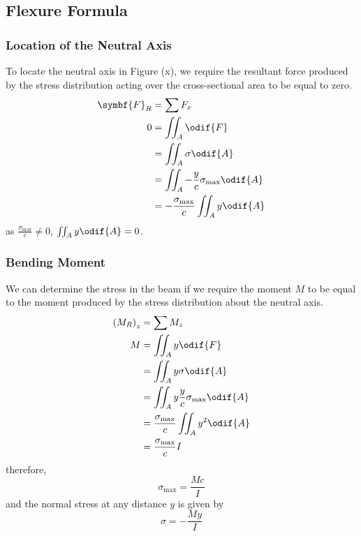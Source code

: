 \documentclass{article}
\begin{document}
\subsection{Flexure Formula}
\subsubsection{Location of the Neutral Axis}
To locate the neutral axis in Figure (x), we require the resultant force produced by the stress distribution
acting over the cross-sectional area to be equal to zero.
\begin{align*}
    \symbf{F}_R & = \sum F_x                                           \\
    0           & = \iint_A \odif{F}                                   \\
                & = \iint_A \sigma \odif{A}                            \\
                & = \iint_A -\frac{y}{c} \sigma_{\text{max}} \odif{A}  \\
                & = - \frac{\sigma_{\text{max}}}{c} \iint_A y \odif{A}
\end{align*}
as \(\frac{\sigma_{\text{max}}}{c} \neq 0\), \(\iint_A y \odif{A} = 0\).
\subsubsection{Bending Moment}
We can determine the stress in the beam if we
require the moment \(M\) to be equal to the moment produced by the stress
distribution about the neutral axis.
\begin{align*}
    \left( M_R \right)_z & = \sum M_z                                           \\
    M                    & = \iint_A y \odif{F}                                 \\
                         & = \iint_A y \sigma \odif{A}                          \\
                         & = \iint_A y \frac{y}{c} \sigma_{\text{max}} \odif{A} \\
                         & = \frac{\sigma_{\text{max}}}{c} \iint_A y^2 \odif{A} \\
                         & = \frac{\sigma_{\text{max}}}{c} I
\end{align*}
therefore,
\begin{equation*}
    \sigma_{\text{max}} = \frac{M c}{I}
\end{equation*}
and the normal stress at any distance \(y\) is given by
\begin{equation*}
    \sigma = -\frac{M y}{I}
\end{equation*}
\end{document}
